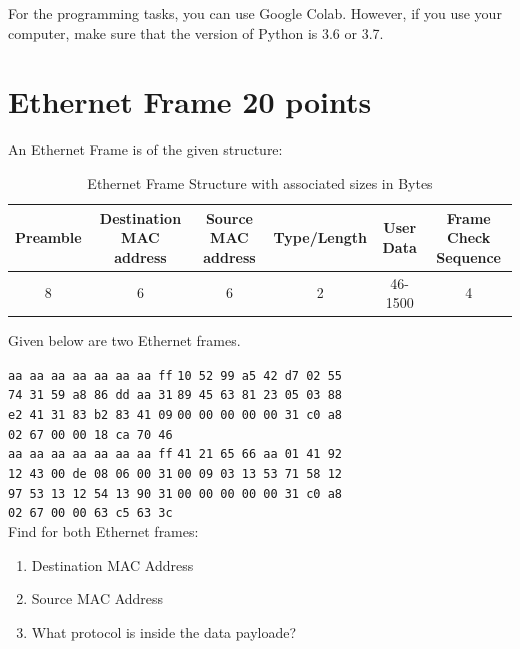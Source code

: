 \documentclass{resources/WeSTassignment}
\begin{document}
For the programming tasks, you can use Google Colab. However, if you use your computer, make sure that the version of Python is 3.6 or 3.7.

\section{Ethernet Frame \hfill{20 points}}
An Ethernet Frame is of the given structure:
\begin{table}[h]
    \centering
    \scriptsize
    \begin{tabular}{|c|c|c|c|c|c|}
    \hline
         Preamble & Destination MAC address & Source MAC address & Type/Length & User Data & Frame Check Sequence  \\ \hline
         8 & 6 & 6 & 2 & 46-1500 & 4 \\ \hline
    \end{tabular}
    \caption{Ethernet Frame Structure with associated sizes in Bytes}
    \label{tab:ethernet_frame_structure}
\end{table}

Given below are two Ethernet frames.

    \texttt{aa aa aa aa aa aa aa ff} \hspace{2cm} \texttt{10 52 99 a5 42 d7 02 55} \\
    \texttt{74 31 59 a8 86 dd aa 31} \hspace{2cm} \texttt{89 45 63 81 23 05 03 88} \\
    \texttt{e2 41 31 83 b2 83 41 09} \hspace{2cm} \texttt{00 00 00 00 00 31 c0 a8} \\
    \texttt{02 67 00 00 18 ca 70 46} \\
    

    \texttt{aa aa aa aa aa aa aa ff} \hspace{2cm} \texttt{41 21 65 66 aa 01 41 92} \\
    \texttt{12 43 00 de 08 06 00 31} \hspace{2cm} \texttt{00 09 03 13 53 71 58 12} \\
    \texttt{97 53 13 12 54 13 90 31} \hspace{2cm} \texttt{00 00 00 00 00 31 c0 a8} \\ 
    \texttt{02 67 00 00 63 c5 63 3c} \\
    
    Find for both Ethernet frames:
    \begin{enumerate}
        \item Destination MAC Address
        \item Source MAC Address
        \item What protocol is inside the data payloade?
    \end{enumerate}
    
\end{document}
